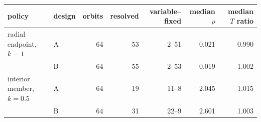 \begin{tabular}{@{}l l r r r r r@{}}
\toprule
policy & design & orbits & resolved & variable--fixed & median $\rho$ & median $T$ ratio \\
\midrule
radial endpoint, $k=1$ & A & 64 & 53 & 2--51 & 0.021 & 0.990 \\
 & B & 64 & 55 & 2--53 & 0.019 & 1.002 \\
\midrule
interior member, $k=0.5$ & A & 64 & 19 & 11--8 & 2.045 & 1.015 \\
 & B & 64 & 31 & 22--9 & 2.601 & 1.003 \\
\bottomrule
\end{tabular}
